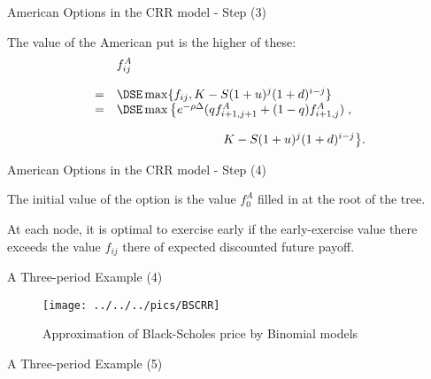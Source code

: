 
{American Options in the CRR model - Step (3)}


	The value of
the American put is the higher of these:
$$
\begin{array}{ll}
&f^A_{ij} \\*[12pt]=&\DSE \max\{f_{ij}, K - S (1+u)^j (1+d)^{i-j}\}\\
=&\DSE \max\left\{e^{-\rho \Delta} (q f^A_{i+1,j+1} + (1 - q)
f^A_{i+1,j})\right.,\\*[12pt]
&\hspace{3cm} \left. K - S (1+u)^j (1+d)^{i-j}\right\}\!.
\end{array}
$$


{American Options in the CRR model - Step (4)}


\setcounter{enumi}{4}

	The initial value of the option is the value $f^A_0$ filled in
at the
root of the tree.

	At each node, it is optimal to exercise early if the
early-exercise value there exceeds the value $f_{ij}$ there of
expected discounted future payoff.


{ A Three-period Example (4)}

\begin{figure}[htb]
\begin{center}
  \texttt{[image: ../../../pics/BSCRR]}
\caption{Approximation of Black-Scholes price by Binomial models}
\end{center}\label{BSCRR}
\end{figure}


{ A Three-period Example (5)}

